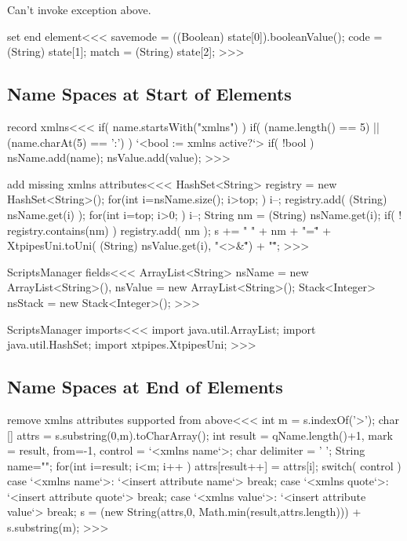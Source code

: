 \documentclass{article}
\begin{document}
Can't invoke exception above.

\<set end element\><<<
savemode = ((Boolean) state[0]).booleanValue();
code = (String) state[1];
match = (String) state[2];
>>>




\subsection{Name Spaces at Start of Elements}

\<record xmlns\><<<
if( name.startsWith("xmlns") ){
  if( (name.length() == 5) || (name.charAt(5) == ':') ){
     `<bool := xmlns active?`>
     if( !bool ){
        nsName.add(name); nsValue.add(value);
} }  }
>>>





\<add missing xmlns attributes\><<<
HashSet<String> registry = new HashSet<String>();
for(int i=nsName.size(); i>top; ){
  i--;
  registry.add( (String) nsName.get(i) );
}
for(int i=top; i>0; ){
  i--;
  String nm = (String) nsName.get(i);
  if( ! registry.contains(nm) ){
     registry.add( nm );
     s += " " + nm + "=\"" +
         XtpipesUni.toUni( (String) nsValue.get(i), "<>&\"") + "\"";
} }
>>>




\<ScriptsManager fields\><<<
ArrayList<String> nsName = new ArrayList<String>(),
                         nsValue = new ArrayList<String>();
Stack<Integer> nsStack = new Stack<Integer>();
>>>

\<ScriptsManager imports\><<<
import java.util.ArrayList;
import java.util.HashSet;
import xtpipes.XtpipesUni;
>>>


\subsection{Name Spaces at End of Elements}


\<remove xmlns attributes supported from above\><<<
int m = s.indexOf('>');
char [] attrs = s.substring(0,m).toCharArray();
int result = qName.length()+1,
    mark = result,
    from=-1,
    control = `<xmlns name`>;
char delimiter = ' ';
String name="";
for(int i=result; i<m; i++ ){
  attrs[result++] = attrs[i];
  switch( control ){
    case  `<xmlns name`>: { `<insert attribute name`>  break; }
    case `<xmlns quote`>: { `<insert attribute quote`> break; }
    case `<xmlns value`>: { `<insert attribute value`> break; }
} }
s =  (new String(attrs,0, Math.min(result,attrs.length)))
          + s.substring(m);
>>>
\end{document}
